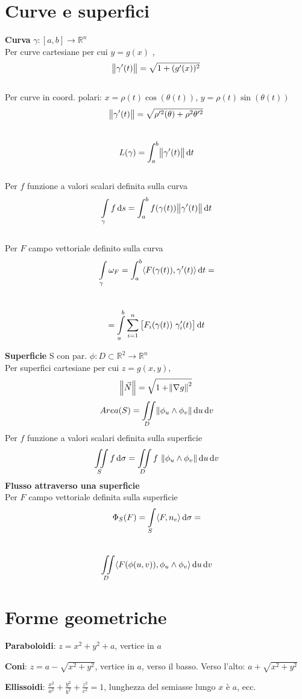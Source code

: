 \documentclass[a4paper,portrait,columns=3,5pt]{cheatsheet}
\begin{document}
\section{Curve e superfici}
\textbf{Curva} $\gamma:[a,b]\rightarrow\mathbb{R}^n$\\
Per curve cartesiane per cui $y = g(x)$ , $$\norm{\gamma'(t)} = \sqrt{1 + (g'(x))^2}$$\\
Per curve in coord. polari: $x = \rho(t) \cos(\theta(t))$, $y = \rho(t) \sin(\theta(t))$
$$\norm{\gamma'(t)} = \sqrt{\rho'^2(\theta) + \rho^2\theta'^2} $$\\
$$ L(\gamma) = \int_{a}^{b} \norm{\gamma'(t)} \dif t$$\\
Per $f$ funzione a valori scalari definita sulla curva
$$ \int\limits_{\gamma} f\dif s = \int_a^b f(\gamma(t)) \norm{\gamma'(t)} \dif t$$\\
Per $F$ campo vettoriale definito sulla curva
$$ \int\limits_\gamma \omega_{F} = \int_a^b \langle F(\gamma(t)), \gamma'(t)\rangle \dif t = $$\\
$$ = \int\limits_a^b \sum_{i=1}^n\left[F_i(\gamma(t))~\gamma_i'(t)\right] \dif t$$

\textbf{Superficie} S con par. $\phi:D\subset\mathbb{R}^2\rightarrow\mathbb{R}^n$\\
Per superfici cartesiane per cui $z = g(x,y)$, $$\norm{\vec N} = \sqrt{1 + \norm{\nabla g}^2}$$
$$ Area(S) = \iint\limits_D \norm{\phi_u \wedge \phi_v} \dif u \dif v$$
Per $f$ funzione a valori scalari definita sulla superficie
$$ \iint\limits_S f \dif \sigma = \iint\limits_D f ~\norm{\phi_u \wedge \phi_v} \dif u \dif v $$
\textbf{Flusso attraverso una superficie}\\ Per $F$ campo vettoriale definita sulla superficie
$$ \Phi_S(F) = \int\limits_S \langle F, n_e \rangle \dif \sigma = $$ \\ 
$$ \iint\limits_D \langle F(\phi(u,v)), \phi_u \wedge \phi_v \rangle \dif u \dif v$$

\section{Forme geometriche}

\textbf{Paraboloidi}: $z = x^2 + y^2 + a$, vertice in $a$

\textbf{Coni}: $z = a - \sqrt{x^2 + y^2}$, vertice in $a$, verso il basso. Verso l'alto: $a + \sqrt{x^2 + y^2}$

\textbf{Ellissoidi}: $\frac{x^2}{a^2} + \frac{y^2}{b^2} + \frac{z^2}{c^2} = 1$, lunghezza del semiasse lungo $x$ è $a$, ecc. 
\end{document}

